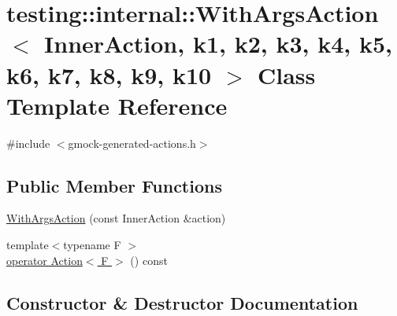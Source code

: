 \hypertarget{classtesting_1_1internal_1_1_with_args_action}{}\section{testing\+:\+:internal\+:\+:With\+Args\+Action$<$ Inner\+Action, k1, k2, k3, k4, k5, k6, k7, k8, k9, k10 $>$ Class Template Reference}
\label{classtesting_1_1internal_1_1_with_args_action}


{\ttfamily \#include $<$gmock-\/generated-\/actions.\+h$>$}

\subsection*{Public Member Functions}
\begin{DoxyCompactItemize}
\item 
\hyperlink{classtesting_1_1internal_1_1_with_args_action_ab408f9c56c8f25564ef554b984e1c926}{With\+Args\+Action} (const Inner\+Action \&action)
\item 
{\footnotesize template$<$typename F $>$ }\\\hyperlink{classtesting_1_1internal_1_1_with_args_action_ab6d8f89fd5a54f2914da2523b2ba6ee5}{operator Action$<$ F $>$} () const
\end{DoxyCompactItemize}


\subsection{Constructor \& Destructor Documentation}
\mbox{\label{classtesting_1_1internal_1_1_with_args_action_ab408f9c56c8f25564ef554b984e1c926}} 
